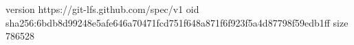 version https://git-lfs.github.com/spec/v1
oid sha256:6bdb8d99248e5afe646a70471fcd751f648a871f6f923f5a4d87798f59edb1ff
size 786528
